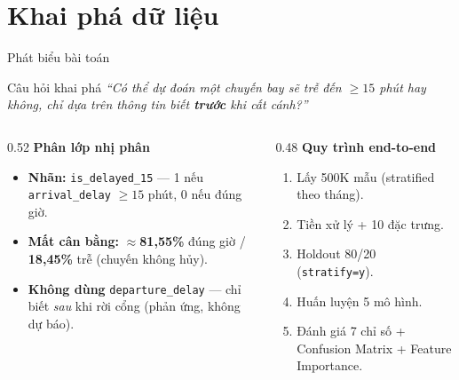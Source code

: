 \section{Khai phá dữ liệu}

\begin{frame}{Phát biểu bài toán}
\begin{block}{Câu hỏi khai phá}
\textit{``Có thể dự đoán một chuyến bay sẽ trễ đến $\geq 15$ phút hay không,
chỉ dựa trên thông tin biết \textbf{trước} khi cất cánh?''}
\end{block}

\vspace{2mm}
\begin{columns}[T,onlytextwidth]
\begin{column}{0.52\textwidth}
\small\textbf{Phân lớp nhị phân}
\begin{itemize}\setlength\itemsep{0.2em}
  \item \textbf{Nhãn:} \texttt{is\_delayed\_15} --- 1 nếu \texttt{arrival\_delay} $\geq 15$ phút, 0 nếu đúng giờ.
  \item \textbf{Mất cân bằng:} $\approx$\textbf{81{,}55\%} đúng giờ / \textbf{18{,}45\%} trễ (chuyến không hủy).
  \item \textbf{Không dùng} \texttt{departure\_delay} --- chỉ biết \textit{sau} khi rời cổng (phản ứng, không dự báo).
\end{itemize}
\end{column}
\begin{column}{0.48\textwidth}
\small\textbf{Quy trình end-to-end}
\begin{enumerate}\setlength\itemsep{0.15em}
  \item Lấy 500K mẫu (stratified theo tháng).
  \item Tiền xử lý + 10 đặc trưng.
  \item Holdout 80/20 (\texttt{stratify=y}).
  \item Huấn luyện 5 mô hình.
  \item Đánh giá 7 chỉ số + Confusion Matrix + Feature Importance.
\end{enumerate}
\end{column}
\end{columns}
\end{frame}

